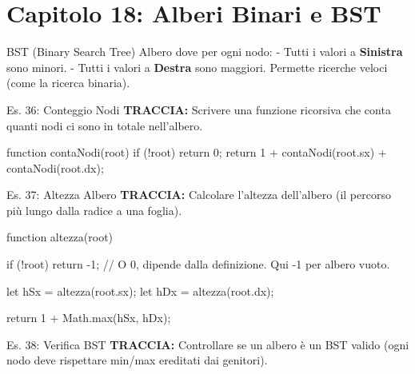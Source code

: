 \section{Capitolo 18: Alberi Binari e BST}

\begin{dizionario}{BST (Binary Search Tree)}
Albero dove per ogni nodo:
- Tutti i valori a \textbf{Sinistra} sono minori.
- Tutti i valori a \textbf{Destra} sono maggiori.
Permette ricerche veloci (come la ricerca binaria).
\end{dizionario}

\begin{esercizio}{Es. 36: Conteggio Nodi}
\textbf{TRACCIA:} Scrivere una funzione ricorsiva che conta quanti nodi ci sono in totale nell'albero.
\end{esercizio}

\begin{jsbox}
function contaNodi(root) {
    if (!root) return 0;
    return 1 + contaNodi(root.sx) + contaNodi(root.dx);
}
\end{jsbox}

\begin{esercizio}{Es. 37: Altezza Albero}
\textbf{TRACCIA:} Calcolare l'altezza dell'albero (il percorso più lungo dalla radice a una foglia).
\end{esercizio}

\begin{jsbox}
function altezza(root) {
    if (!root) return -1; // O 0, dipende dalla definizione. Qui -1 per albero vuoto.
    
    let hSx = altezza(root.sx);
    let hDx = altezza(root.dx);
    
    return 1 + Math.max(hSx, hDx);
}
\end{jsbox}

\begin{esercizio}{Es. 38: Verifica BST}
\textbf{TRACCIA:} Controllare se un albero è un BST valido (ogni nodo deve rispettare min/max ereditati dai genitori).
\end{esercizio}

